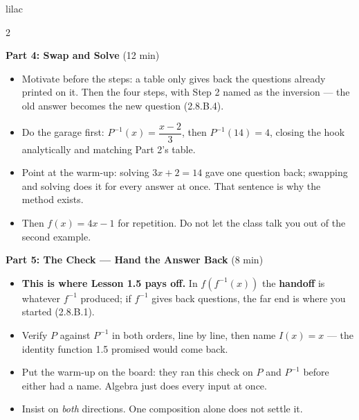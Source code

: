 \documentclass[10pt]{article}
\begin{document}
\begin{skillbox}[Lesson]{lilac}
\begin{multicols}{2}
\columnbreak

\textbf{Part 4: Swap and Solve} (12 min)

\begin{itemize}
  \item Motivate before the steps: a table only gives back the questions
        already printed on it. Then the four steps, with Step 2 named as the
        inversion --- the old answer becomes the new question (2.8.B.4).
  \item Do the garage first: $P^{-1}(x) = \dfrac{x-2}{3}$, then
        $P^{-1}(14) = 4$, closing the hook analytically and matching Part 2's
        table.
  \item Point at the warm-up: solving $3x + 2 = 14$ gave one question back;
        swapping and solving does it for every answer at once. That sentence is
        why the method exists.
  \item Then $f(x) = 4x - 1$ for repetition. Do not let the class talk you out
        of the second example.
\end{itemize}

\textbf{Part 5: The Check --- Hand the Answer Back} (8 min)

\begin{itemize}
  \item \textbf{This is where Lesson 1.5 pays off.} In $f(f^{-1}(x))$ the
        \textbf{handoff} is whatever $f^{-1}$ produced; if $f^{-1}$ gives back
        questions, the far end is where you started (2.8.B.1).
  \item Verify $P$ against $P^{-1}$ in both orders, line by line, then name
        $I(x) = x$ --- the identity function 1.5 promised would come back.
  \item Put the warm-up on the board: they ran this check on $P$ and $P^{-1}$
        before either had a name. Algebra just does every input at once.
  \item Insist on \textit{both} directions. One composition alone does not
        settle it.
\end{itemize}
\end{multicols}
\end{skillbox}
\end{document}
